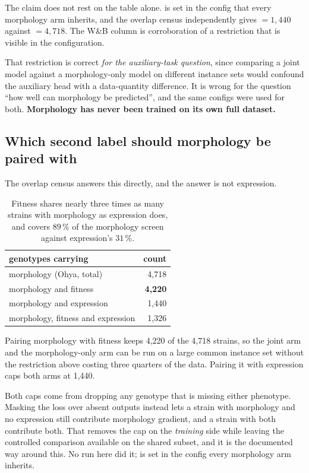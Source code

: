The claim does not rest on the table alone.  is set in the config
that every morphology arm inherits, and the overlap census independently gives
 $= 1{,}440$ against  $= 4{,}718$. The W\&B
column is corroboration of a restriction that is visible in the configuration.

That restriction is correct \emph{for the auxiliary-task question}, since comparing a joint
model against a morphology-only model on different instance sets would confound the
auxiliary head with a data-quantity difference. It is wrong for the question ``how well can
morphology be predicted'', and the same configs were used for both. \textbf{Morphology has
never been trained on its own full dataset.}

\subsection{Which second label should morphology be paired with}

The overlap census answers this directly, and the answer is not expression.

\begin{table}[htbp]
\centering\small
\begin{tabular}{lr}
\toprule
genotypes carrying & count \\
\midrule
morphology (Ohya, total) & 4{,}718 \\
morphology and fitness & \textbf{4{,}220} \\
morphology and expression & 1{,}440 \\
morphology, fitness and expression & 1{,}326 \\
\bottomrule
\end{tabular}
\caption[]{Fitness shares nearly three times as many strains with morphology as expression
does, and covers $89\,\%$ of the morphology screen against expression's $31\,\%$.}
\label{tab:morph-overlap}
\end{table}

Pairing morphology with fitness keeps 4,220 of the 4,718 strains, so the joint arm and the
morphology-only arm can be run on a large common instance set without the restriction above
costing three quarters of the data. Pairing it with expression caps both arms at 1,440.

Both caps come from dropping any genotype that is missing either phenotype. Masking the loss
over absent outputs instead lets a strain with morphology and no expression still contribute
morphology gradient, and a strain with both contribute both. That removes the cap on the
\emph{training} side while leaving the controlled comparison available on the shared subset,
and it is the documented way around this. No run here did it;  is
set in the config every morphology arm inherits.

